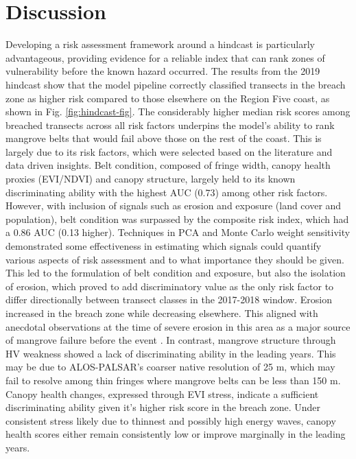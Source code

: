 \documentclass[final-report]{report-template}
\begin{document}
\section{Discussion}
Developing a risk assessment framework around a hindcast is particularly advantageous, providing evidence for a reliable index that can rank zones of vulnerability before the known hazard occurred. The results from the 2019 hindcast show that the model pipeline correctly classified transects in the breach zone as higher risk compared to those elsewhere on the Region Five coast, as shown in Fig. \ref{fig:hindcast-fig}. The considerably higher median risk scores among breached transects across all risk factors underpins the model's ability to rank mangrove belts that would fail above those on the rest of the coast. This is largely due to its risk factors, which were selected based on the literature and data driven insights. Belt condition, composed of fringe width, canopy health proxies (EVI/NDVI) and canopy structure, largely held to its known discriminating ability with the highest AUC (0.73) among other risk factors. However, with inclusion of signals such as erosion and exposure (land cover and population), belt condition was surpassed by the composite risk index, which had a 0.86 AUC (0.13 higher). Techniques in PCA and Monte Carlo weight sensitivity demonstrated some effectiveness in estimating which signals could quantify various aspects of risk assessment and to what importance they should be given. This led to the formulation of belt condition and exposure, but also the isolation of erosion, which proved to add discriminatory value as the only risk factor to differ directionally between transect classes in the 2017-2018 window. Erosion increased in the breach zone while decreasing elsewhere. This aligned with anecdotal observations at the time of severe erosion in this area as a major source of mangrove failure before the event \parencite{Starbroek2019}. In contrast, mangrove structure through HV weakness showed a lack of discriminating ability in the leading years. This may be due to ALOS-PALSAR's coarser native resolution of 25 m, which may fail to resolve among thin fringes where mangrove belts can be less than 150 m. Canopy health changes, expressed through EVI stress, indicate a sufficient discriminating ability given it's higher risk score in the breach zone. Under consistent stress likely due to thinnest and possibly high energy waves, canopy health scores either remain consistently low or improve marginally in the leading years. 
\end{document}
